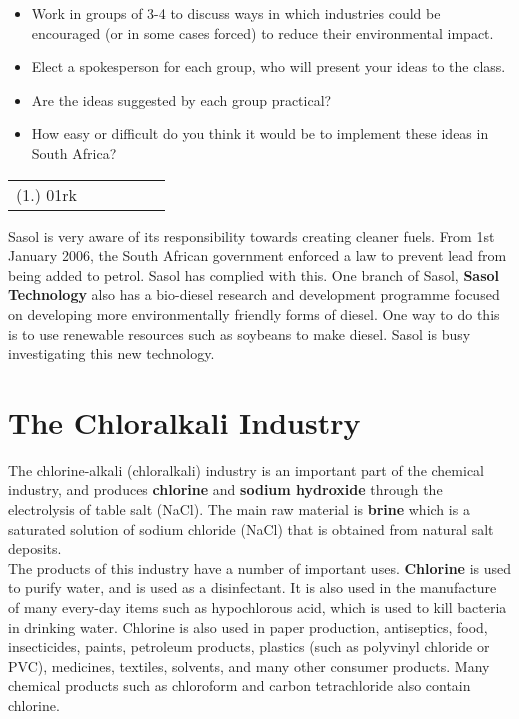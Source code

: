 {\begin{enumerate}
{\begin{itemize}
\item{Work in groups of 3-4 to discuss ways in which industries could be encouraged (or in some cases forced) to reduce their environmental impact.}
\item{Elect a spokesperson for each group, who will present your ideas to the class.}
\item{Are the ideas suggested by each group practical?}
\item{How easy or difficult do you think it would be to implement these ideas in South Africa?}
\end{itemize}}
\end{enumerate}

\par \practiceinfo
\par \begin{tabular}[h]{cccccc}
(1.)	01rk	&
\end{tabular}
}

\begin{IFact}{Sasol is very aware of its responsibility towards creating cleaner fuels. From 1st January 2006, the South African government enforced a law to prevent lead from being added to petrol. Sasol has complied with this. One branch of Sasol, \textbf{Sasol Technology} also has a bio-diesel research and development programme focused on developing more environmentally friendly forms of diesel. One way to do this is to use renewable resources such as soybeans to make diesel. Sasol is busy investigating this new technology.
}
\end{IFact}

\section{The Chloralkali Industry}
\label{sec:chemical:chloralkali}

The chlorine-alkali (chloralkali) industry is an important part of the chemical industry, and produces \textbf{chlorine} and \textbf{sodium hydroxide} through the electrolysis of table salt (NaCl). The main raw material is \textbf{brine} which is a saturated solution of sodium chloride (NaCl) that is obtained from natural salt deposits. \\

The products of this industry have a number of important uses. \textbf{Chlorine} is used to purify water, and is used as a disinfectant. It is also used in the manufacture of many every-day items such as hypochlorous acid, which is used to kill bacteria in drinking water. Chlorine is also used in paper production, antiseptics, food, insecticides, paints, petroleum products, plastics (such as polyvinyl chloride or PVC), medicines, textiles, solvents, and many other consumer products. Many chemical products such as chloroform and carbon tetrachloride also contain chlorine.\\

